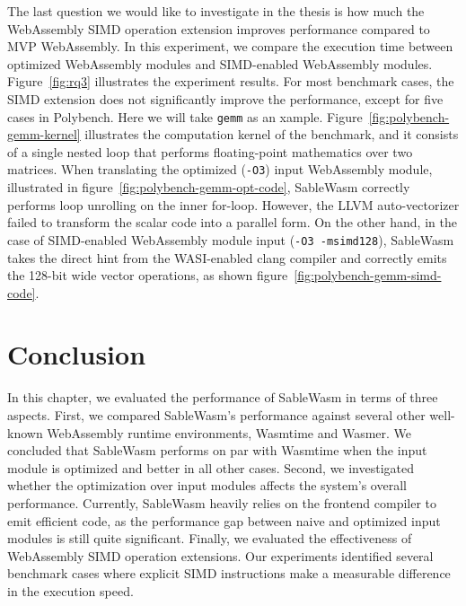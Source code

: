The last question we would like to investigate in the thesis is how much
the WebAssembly SIMD operation extension improves performance compared to MVP
WebAssembly. In this experiment, we compare the execution time between
optimized WebAssembly modules and SIMD-enabled WebAssembly modules.
Figure~\ref{fig:rq3} illustrates the experiment results. For most benchmark
cases, the SIMD extension does not significantly improve the performance,
except for five cases in Polybench. Here we will take \texttt{gemm} as an
xample. Figure~\ref{fig:polybench-gemm-kernel} illustrates the computation
kernel of the benchmark, and it consists of a single nested loop that performs
floating-point mathematics over two matrices. When translating the optimized
(\texttt{-O3}) input WebAssembly module, illustrated in
figure~\ref{fig:polybench-gemm-opt-code}, SableWasm correctly performs loop
unrolling on the inner for-loop. However, the LLVM auto-vectorizer failed to
transform the scalar code into a parallel form. On the other hand, in the case
of SIMD-enabled WebAssembly module input (\texttt{-O3 -msimd128}), SableWasm
takes the direct hint from the WASI-enabled clang compiler and correctly emits
the 128-bit wide vector operations, as shown
figure~\ref{fig:polybench-gemm-simd-code}.

\section*{Conclusion}

In this chapter, we evaluated the performance of SableWasm in terms of three
aspects. First, we compared SableWasm's performance against several other
well-known WebAssembly runtime environments, Wasmtime and Wasmer. We concluded
that SableWasm performs on par with Wasmtime when the input module is optimized
and better in all other cases. Second, we investigated whether the optimization
over input modules affects the system's overall performance. Currently,
SableWasm heavily relies on the frontend compiler to emit efficient code, as
the performance gap between naive and optimized input modules is still quite
significant. Finally, we evaluated the effectiveness of WebAssembly SIMD
operation extensions. Our experiments identified several benchmark cases where
explicit SIMD instructions make a measurable difference in the execution speed.